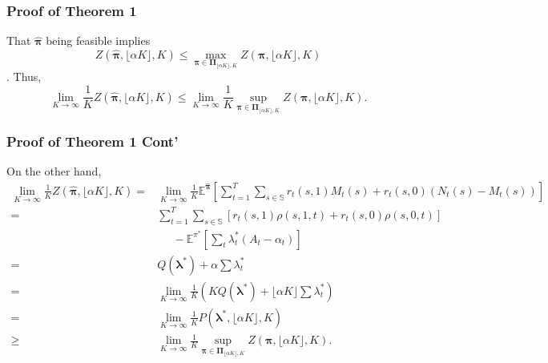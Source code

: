\documentclass{beamer}
\newcommand{\Eb}{\mathbb{E}}
\newcommand{\lambdav}{\pmb{\lambda}}
\newcommand{\allp}{\pmb{\pi}}
\newcommand{\allpset}{\mathbf{\Pi}}
\newcommand{\subp}{\pi}
\newcommand{\substates}{\mathbb{S}}
\begin{document}
\begin{frame}
\begin{figure}[tb]
\end{figure}
\end{frame}

\begin{frame}
\frametitle{Proof of Theorem 1}
That $\hat{\allp}$ being feasible implies $$Z(\hat{\allp},\lfloor \alpha K\rfloor,K) \leq \max_{\allp\in\allpset_{\lfloor \alpha K\rfloor,K}}Z(\allp,\lfloor \alpha K\rfloor,K)$$.  Thus,
\begin{equation*}
\lim_{K\rightarrow\infty}\frac{1}{K}Z(\hat{\allp},\lfloor \alpha K\rfloor,K) \leq  \lim_{K\rightarrow\infty}\frac{1}{K}\sup_{\allp\in\allpset_{\lfloor \alpha K\rfloor,K}}Z(\allp,\lfloor \alpha K\rfloor,K).
\end{equation*}
\end{frame}

\begin{frame}
\frametitle{Proof of Theorem 1 Cont'}
On the other hand,
\footnotesize
\begin{align*}
\lim_{K\rightarrow\infty}\frac{1}{K}Z(\hat{\allp},\lfloor \alpha K\rfloor,K) 
=&\lim_{K\rightarrow\infty}\frac{1}{K}\Eb^{\hat{\allp}}\left[\sum_{t=1}^{T}\sum_{s\in\substates}r_t(s,1) M_{t}(s)+r_t(s,0) (N_{t}(s)-M_{t}(s))\right]\\
=&\sum_{t=1}^{T}\sum_{s\in \substates}\left[r_t(s,1) \rho(s,1,t)+r_t(s,0) \rho(s,0,t) \right]\\
&\;\;\;\;\;-\mathbb{E}^{\subp^*}\left[\sum_{t}\lambda^*_t \left(A_t-\alpha_t\right)\right]\\
=& Q(\lambdav^*)+\alpha \sum\lambda^*_t\\
=& \lim_{K\rightarrow\infty}\frac{1}{K}(KQ(\lambdav^*)+\lfloor \alpha K \rfloor\sum\lambda^*_t)\\
=& \lim_{K\rightarrow\infty}\frac{1}{K} P(\lambdav^*,\lfloor \alpha K \rfloor, K)\\
\geq& \lim_{K\rightarrow\infty}\frac{1}{K}\sup_{\allp\in\allpset_{\lfloor \alpha K\rfloor,K}}Z(\allp,\lfloor \alpha K\rfloor,K).
\end{align*}
\end{frame}
\end{document}
